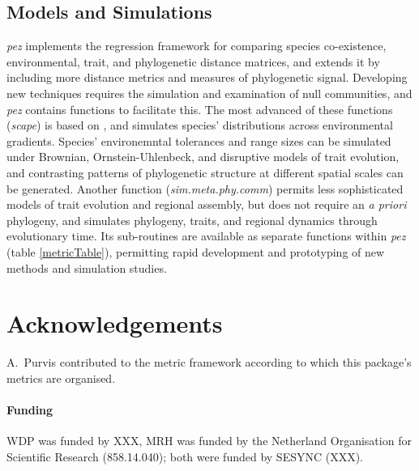 \documentclass{bioinfo}
\begin{document}
\subsection{Models and Simulations}
\emph{pez} implements the \citet{Cavender-Bares2004} regression
framework for comparing species co-existence, environmental, trait,
and phylogenetic distance matrices, and extends it by including more
distance metrics and measures of phylogenetic signal. Developing new
techniques requires the simulation and examination of null
communities, and \emph{pez} contains functions to facilitate this.
The most advanced of these functions (\emph{scape}) is based on
\citet{Helmus2012}, and simulates species' distributions across
environmental gradients. Species' environemntal tolerances and range
sizes can be simulated under Brownian, Ornstein-Uhlenbeck, and
disruptive models of trait evolution, and contrasting patterns of
phylogenetic structure at different spatial scales can be
generated. Another function (\emph{sim.meta.phy.comm}) permits less
sophisticated models of trait evolution and regional assembly, but
does not require an \emph{a priori} phylogeny, and simulates
phylogeny, traits, and regional dynamics through evolutionary
time. Its sub-routines are available as separate functions within
\emph{pez} (table \ref{metricTable}), permitting rapid development and
prototyping of new methods and simulation studies.

\section*{Acknowledgements}
A.\ Purvis contributed to the metric framework according to which this
package's metrics are organised.
\paragraph{Funding\textcolon} WDP was funded by XXX, MRH was funded by
the Netherland Organisation for Scientific Research (858.14.040); both
were funded by SESYNC (XXX).
\end{document}
